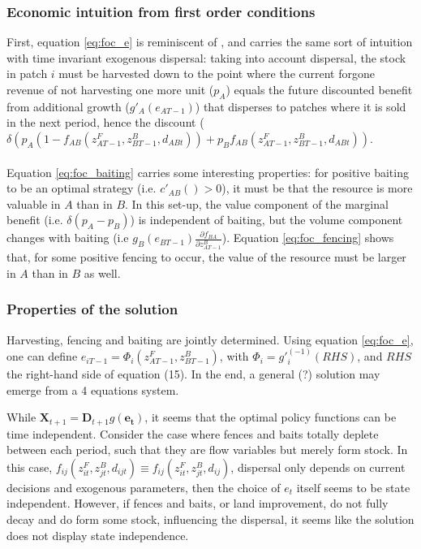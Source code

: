 \documentclass{article}
\begin{document}
\subsubsection{Economic intuition from first order conditions}
First, equation \ref{eq:foc_e} is reminiscent of \cite{costello_optimal_2008}, and carries the same sort of intuition with time invariant exogenous dispersal: taking into account dispersal, the stock in patch $i$ must be harvested down to the point where the current forgone revenue of not harvesting one more unit ($p_A$) equals the future discounted benefit from additional growth ($g'_A(e_{AT-1})$) that disperses to patches where it is sold in the next period, hence the discount ($\delta (p_A (1-f_{AB}(z_{AT-1}^F, z_{BT-1}^B, d_{ABt}))+ p_B f_{AB}(z_{AT-1}^F, z_{BT-1}^B, d_{ABt}))$.
\\\\
Equation \ref{eq:foc_baiting} carries some interesting properties: for positive baiting to be an optimal strategy (i.e. $c'_{AB}()>0$), it must be that the resource is more valuable in $A$ than in $B$. In this set-up, the value component of the marginal benefit (i.e. $\delta (p_A - p_B)$) is independent of baiting, but the volume component changes with baiting (i.e $g_B(e_{BT-1})\frac{\partial f_{BA}}{\partial z_{AT-1}^B}$). Equation \ref{eq:foc_fencing} shows that, for some positive fencing to occur, the value of the resource must be larger in $A$ than in $B$ as well.

\subsubsection{Properties of the solution}
Harvesting, fencing and baiting are jointly determined. Using equation \ref{eq:foc_e}, one can define $e_{iT-1}=\Phi_i(z_{AT-1}^F, z_{BT-1}^B)$, with $\Phi_i = g'^{(-1)}_i(RHS)$, and $RHS$ the right-hand side of equation (15). In the end, a general (?) solution may emerge from a 4 equations system.

While $\mathbf{X}_{t+1} = \mathbf{D}_{t+1}g(\mathbf{e_t})$, it seems that the optimal policy functions can be time independent. Consider the case where fences and baits totally deplete between each period, such that they are flow variables but merely form stock. In this case, $f_{ij}(z_{it}^F, z_{jt}^B, d_{ijt})\equiv f_{ij}(z_{it}^F, z_{jt}^B, d_{ij})$, dispersal only depends on current decisions and exogenous parameters, then the choice of $e_t$ itself seems to be state independent. However, if fences and baits, or land improvement, do not fully decay and do form some stock, influencing the dispersal, it seems like the solution does not display state independence. 
\end{document}
